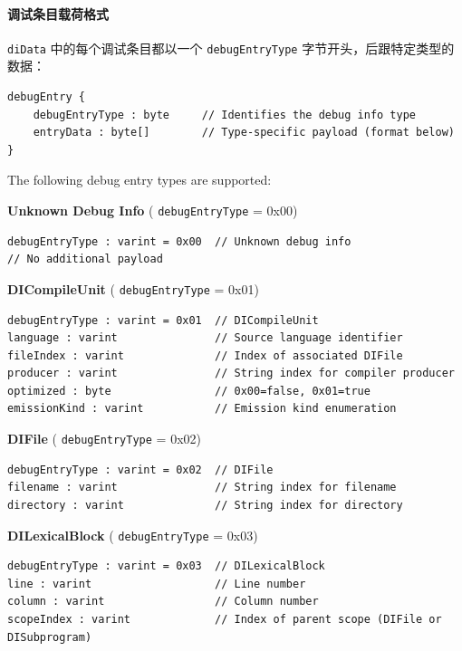 \documentclass{article}
\begin{document}
\paragraph{调试条目载荷格式}

\texttt{diData} 中的每个调试条目都以一个 \texttt{debugEntryType} 字节开头，后跟特定类型的数据：


\begin{lstlisting}
debugEntry {
    debugEntryType : byte     // Identifies the debug info type
    entryData : byte[]        // Type-specific payload (format below)
}
\end{lstlisting}

The following debug entry types are supported:


\textbf{Unknown Debug Info} ( \texttt{debugEntryType} = 0x00)


\begin{lstlisting}
debugEntryType : varint = 0x00  // Unknown debug info
// No additional payload
\end{lstlisting}

\textbf{DICompileUnit} ( \texttt{debugEntryType} = 0x01)


\begin{lstlisting}
debugEntryType : varint = 0x01  // DICompileUnit
language : varint               // Source language identifier
fileIndex : varint              // Index of associated DIFile
producer : varint               // String index for compiler producer
optimized : byte                // 0x00=false, 0x01=true
emissionKind : varint           // Emission kind enumeration
\end{lstlisting}

\textbf{DIFile} ( \texttt{debugEntryType} = 0x02)


\begin{lstlisting}
debugEntryType : varint = 0x02  // DIFile
filename : varint               // String index for filename
directory : varint              // String index for directory
\end{lstlisting}

\textbf{DILexicalBlock} ( \texttt{debugEntryType} = 0x03)


\begin{lstlisting}
debugEntryType : varint = 0x03  // DILexicalBlock
line : varint                   // Line number
column : varint                 // Column number
scopeIndex : varint             // Index of parent scope (DIFile or DISubprogram)
\end{lstlisting}
\end{document}
